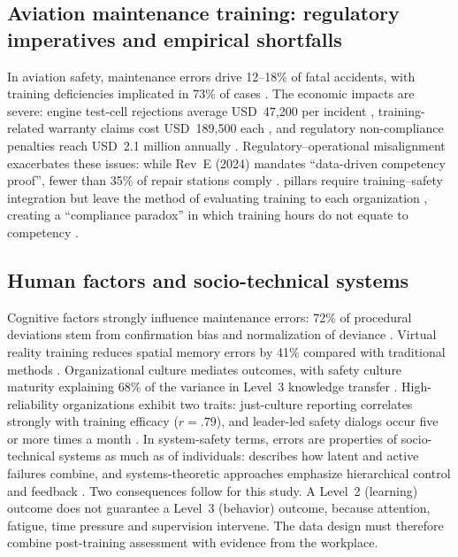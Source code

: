 \subsection{Aviation maintenance training: regulatory imperatives and empirical shortfalls}
\label{subsec:aviation-training}

In aviation safety, maintenance errors drive 12--18\% of fatal accidents, with training deficiencies implicated in 73\% of cases \parencite{EASA2025}.  The economic impacts are severe: engine test-cell rejections average USD~47,200 per incident \parencite{IATAMRO2025}, training-related warranty claims cost USD~189,500 each \parencite{Zhang2025}, and regulatory non-compliance penalties reach USD~2.1 million annually \parencite{FAA2024}.  Regulatory--operational misalignment exacerbates these issues: while \AS{} Rev~E (2024) mandates ``data-driven competency proof'', fewer than 35\% of repair stations comply \parencite{SAE2025}.  \SMS{} pillars require training--safety integration but leave the method of evaluating training to each organization \parencite{Leveson2012,FAA2024}, creating a ``compliance paradox'' in which training hours do not equate to competency \parencite{Nakamura2024}.

\subsection{Human factors and socio-technical systems}
\label{subsec:human-factors}

Cognitive factors strongly influence maintenance errors: 72\% of procedural deviations stem from confirmation bias and normalization of deviance \parencite{Reason1990,Dismukes2023}.  Virtual reality training reduces spatial memory errors by 41\% compared with traditional methods \parencite{Airbus2024}. Organizational culture mediates outcomes, with safety culture maturity explaining 68\% of the variance in Level~3 knowledge transfer \parencite{OConnor2024}. High-reliability organizations exhibit two traits: just-culture reporting correlates strongly with training efficacy ($r = .79$), and leader-led safety dialogs occur five or more times a month \parencite{FAAHERMIT2024}. In system-safety terms, errors are properties of socio-technical systems as much as of individuals: \textcite{Reason2016} describes how latent and active failures combine, and systems-theoretic approaches emphasize hierarchical control and feedback \parencite{Leveson2012}. Two consequences follow for this study. A Level~2 (learning) outcome does not guarantee a Level~3 (behavior) outcome, because attention, fatigue, time pressure and supervision intervene. The data design must therefore combine post-training assessment with evidence from the workplace.

